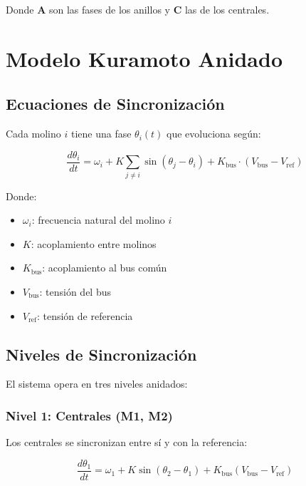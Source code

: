 \documentclass[12pt,a4paper]{article}
\newcommand{\vect}[1]{\mathbf{#1}}
\newcommand{\deriv}[2]{\frac{d#1}{d#2}}
\begin{document}
Donde $\vect{A}$ son las fases de los anillos y $\vect{C}$ las de los centrales.

\section{Modelo Kuramoto Anidado}

\subsection{Ecuaciones de Sincronización}

Cada molino $i$ tiene una fase $\theta_i(t)$ que evoluciona según:

\begin{equation}
\deriv{\theta_i}{t} = \omega_i + K \sum_{j \neq i} \sin(\theta_j - \theta_i) + K_{\text{bus}} \cdot (V_{\text{bus}} - V_{\text{ref}})
\end{equation}

Donde:
\begin{itemize}
    \item $\omega_i$: frecuencia natural del molino $i$
    \item $K$: acoplamiento entre molinos
    \item $K_{\text{bus}}$: acoplamiento al bus común
    \item $V_{\text{bus}}$: tensión del bus
    \item $V_{\text{ref}}$: tensión de referencia
\end{itemize}

\subsection{Niveles de Sincronización}

El sistema opera en tres niveles anidados:

\subsubsection{Nivel 1: Centrales (M1, M2)}

Los centrales se sincronizan entre sí y con la referencia:

\begin{equation}
\deriv{\theta_1}{t} = \omega_1 + K \sin(\theta_2 - \theta_1) + K_{\text{bus}} (V_{\text{bus}} - V_{\text{ref}})
\end{equation}
\end{document}
